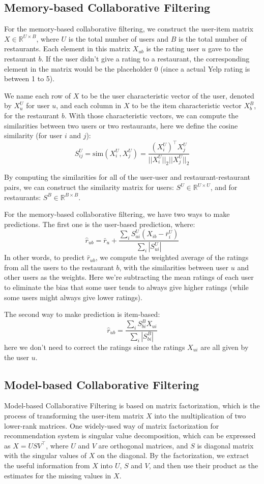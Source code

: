 \documentclass[conference]{IEEEtran}
\begin{document}
\subsection{Memory-based Collaborative Filtering}
For the memory-based collaborative filtering, we construct the
user-item matrix $X \in \mathbb R^{U \times B}$, where $U$ is the total number
of users and $B$ is the total number of restaurants. Each element in this matrix 
$X_{ub}$ is the rating user $u$ gave to the restaurant $b$. If the user didn't
give a rating to a restaurant, the corresponding element in the matrix would
be the placeholder 0 (since a actual Yelp rating is between 1 to 5).
\par
We name each row of $X$ to be the user characteristic vector of the user, 
denoted by $X^U_u$ for user $u$, and each column in $X$ to be the 
item characteristic vector $X^B_b$, for the restaurant $b$. With those 
characteristic vectors, we can compute the similarities between 
two users or two restaurants, here we define the cosine similarity
(for user $i$ and $j$):
\[
S^U_{ij} = \text{sim}(X^U_{i}, X^U_{j}) = \frac{(X^U_{i})^{\top}X^U_{j}}{||X^U_{i}||_2||X^U_{j}||_2}
\]
\par
By computing the similarities for all of the user-user and restaurant-restaurant
pairs, we can construct the similarity matrix for users: 
$S^U \in \mathbb R^{U \times U}$, and for restaurants:
$S^B \in \mathbb R^{B \times B}$. 
\par 
For the memory-based collaborative filtering, we have two ways to make
predictions. The first one is the user-based prediction, where:
\[
\hat{r}_{ub} = \bar{r}_{u} + 
\frac{\sum_i S^U_{ui}(X_{ib} - \bar{r}^U_{i})}{\sum_i|S^U_{ui}|}
\]
In other words, to predict $\hat{r}_{ub}$, we compute the weighted average
of the ratings from all the users to the restaurant $b$, with the similarities
between user $u$ and other users as the weights. Here we're subtracting the
mean ratings of each user to eliminate the bias that some user tends to always
give higher ratings (while some users might always give lower ratings).
\par
The second way to make prediction is item-based:
\[
\hat{r}_{ub} =
\frac{\sum_i S^B_{bi}X_{ui}}{\sum_i|S^B_{bi}|}
\]
here we don't need to correct the ratings since the ratings $X_{ui}$
are all given by the user $u$.

\subsection{Model-based Collaborative Filtering}
Model-based Collaborative Filtering is based on matrix factorization, 
which is the process of transforming the user-item matrix $X$ into
the multiplication of two lower-rank matrices. One widely-used way of 
matrix factorization for recommendation system is singular value 
decomposition\cite{svd},
which can be expressed as $X = USV^{\top}$, where $U$ and $V$ are 
orthogonal matrices, and $S$ is diagonal matrix with the singular values of $X$
on the diagonal. By the factorization, we extract the useful information 
from $X$ into $U$, $S$ and $V$, and then use their product as the estimates
for the missing values in $X$.
    
\end{document}

